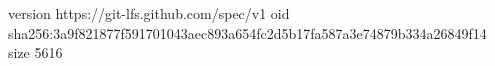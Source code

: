 version https://git-lfs.github.com/spec/v1
oid sha256:3a9f821877f591701043aec893a654fc2d5b17fa587a3e74879b334a26849f14
size 5616
